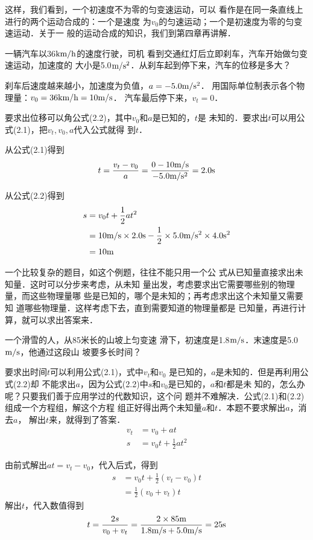     这样，我们看到，一个初速度不为零的匀变速运动，可以
看作是在同一条直线上进行的两个运动合成的：一个是速度
为$v_0$的匀速运动；一个是初速度为零的匀变速运动．关于一
般的运动合成的知识，我们到第四章再讲解．

\begin{example}
一辆汽车以36$\text{km}/\text{h}$的速度行驶，司机
看到交通红灯后立即刹车，汽车开始做匀变速运动，加速度的
大小是5.0$\text{m}/\text{s}^2$．从刹车起到停下来，汽车的位移是多大？
\end{example}

\begin{solution}
    刹车后速度越来越小，加速度为负值，$a=-5.0\text{m}/\text{s}^2$．
用国际单位制表示各个物理量：$v_0=36\text{km}/\text{h}=10\text{m}/\text{s}$．
汽车最后停下来，$v_t=0$．

    要求出位移可以角公式(2.2)，其中$v_0$和$a$是已知的，$t$是
未知的．要求出$t$可以用公式(2.1)，把$v_t,v_0,a$代入公式就得
到$t$．

从公式(2.1)得到
\[t=\frac{v_t-v_0}{a}=\frac{0-10 \text{m}/\text{s}}{-5.0\text{m}/\text{s}^2}=2.0{\rm s} \]

从公式(2.2)得到
\[\begin{split}
s&=v_0t+\frac{1}{2}at^2\\
&=10\text{m}/\text{s} \times 2.0{\rm s}-\frac{1}{2}\times 5.0\text{m}/\text{s}^2 \times 4.0{\rm s}^2\\
&=10{\rm m}
\end{split} \]


\end{solution}

    一个比较复杂的题目，如这个例题，往往不能只用一个公
式从已知量直接求出未知量．这时可以分步来考虑，从未知
量出发，考虑要求出它需要哪些别的物理量，而这些物理量哪
些是已知的，哪个是未知的；再考虑求出这个未知量又需要知
道哪些物理量．这样考虑下去，直到需要知道的物理量都是
已知量，再进行计算，就可以求出答案来．

\begin{example}
一个滑雪的人，从85米长的山坡上匀变速
滑下，初速度是1.8$\text{m}/\text{s}$．末速度是5.0$\text{m}/\text{s}$，他通过这段山
坡要多长时间？
\end{example}

\begin{solution}
    要求出时间$t$可以利用公式(2.1)，式中$v_t$和$v_0$
是已知的，$a$是未知的．但是再利用公式(2.2)却
不能求出$a$，因为公式(2.2)中$s$和$v_0$是已知的，$a$和$t$都是未
知的，怎么办呢？只要我们善于应用学过的代数知识，这个问
题并不难解决．公式(2.1)和(2.2)组成一个方程组，解这个方程
组正好得出两个未知量$a$和$t$．本题不要求解出$a$，消去$a$，
解出$t$来，就得到了答案．
\begin{align*}
v_t&=v_0+at\\
s&=v_0 t+\frac{1}{2}at^2
\end{align*}

由前式解出$at=v_t-v_0$，代入后式，得到
\[\begin{split}
s&=v_0t+\frac{1}{2}(v_t-v_0)t\\
&=\frac{1}{2}(v_0+v_t)t
\end{split} \]
解出$t$，代入数值得到
\[t=\frac{2s}{v_0+v_t}=\frac{2\times 85{\rm m}}{1.8\text{m}/\text{s}+5.0\text{m}/\text{s}}=25{\rm s} \]
\end{solution}

